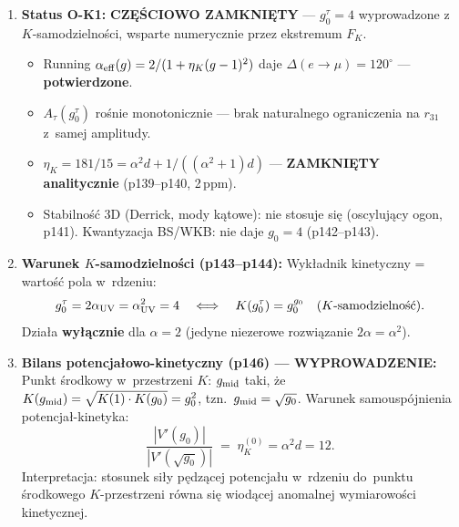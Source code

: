 \begin{enumerate}
  \item \textbf{Status O-K1:}
    \textbf{CZ\k{E}\'SCIOWO ZAMKNI\k{E}TY} --- $g_0^\tau = 4$
    wyprowadzone z~$K$-samodzielno\'sci, wsparte numerycznie przez
    ekstremum $F_K$.
    \begin{itemize}[nosep]
      \item Running $\alpha_{\rm eff}(g) = 2/(1+\eta_K(g-1)^2)$
            daje $\Delta(e\to\mu) = 120^\circ$ --- \textbf{potwierdzone}.
      \item $A_\tau(g_0^\tau)$ ro\'snie monotonicznie
            --- brak naturalnego ograniczenia na $r_{31}$ z~samej amplitudy.
      \item $\eta_K = 181/15 = \alpha^2 d + 1/((\alpha^2+1)d)$
            --- \textbf{ZAMKNI\k{E}TY analitycznie} (p139--p140, 2\,ppm).
      \item Stabilno\'s\'c 3D (Derrick, mody k\k{a}towe): nie stosuje si\k{e}
            (oscyluj\k{a}cy ogon, p141). Kwantyzacja BS/WKB: nie daje $g_0=4$ (p142--p143).
    \end{itemize}

  \item \textbf{Warunek $K$-samodzielno\'sci (p143--p144):}
    Wyk\l{}adnik kinetyczny = warto\'s\'c pola w~rdzeniu:
    \begin{equation}
      g_0^\tau = 2\alpha_{\rm UV} = \alpha_{\rm UV}^2 = 4
      \quad\Longleftrightarrow\quad
      K(g_0^\tau) = g_0^{g_0} \quad\text{($K$-samodzielno\'s\'c)}.
    \end{equation}
    Dzia\l{}a \textbf{wy\l{}\k{a}cznie} dla $\alpha=2$ (jedyne niezerowe
    rozwi\k{a}zanie $2\alpha = \alpha^2$).

  \item \textbf{Bilans potencja\l{}owo-kinetyczny (p146) --- WYPROWADZENIE:}
    Punkt \'srodkowy w~przestrzeni $K$: $g_{\rm mid}$ taki,
    \.ze $K(g_{\rm mid}) = \sqrt{K(1)\cdot K(g_0)} = g_0^2$,
    tzn.\ $g_{\rm mid} = \sqrt{g_0}$.
    Warunek samousp\'ojnienia potencja\l{}-kinetyka:
    \begin{equation}
      \frac{|V'(g_0)|}{|V'(\sqrt{g_0})|}
      \;=\; \eta_K^{(0)} = \alpha^2 d = 12.
    \end{equation}
    Interpretacja: stosunek si\l{}y p\k{e}dz\k{a}cej potencja\l{}u
    w~rdzeniu do~punktu \'srodkowego $K$-przestrzeni
    r\'owna si\k{e} wiod\k{a}cej anomalnej wymiarowo\'sci kinetycznej.


\end{enumerate}

